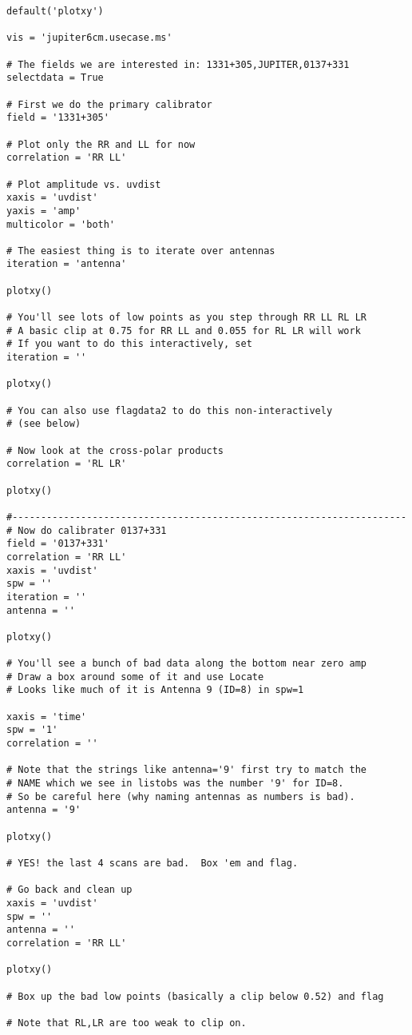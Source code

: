 \small
\begin{verbatim}
default('plotxy')

vis = 'jupiter6cm.usecase.ms'

# The fields we are interested in: 1331+305,JUPITER,0137+331
selectdata = True

# First we do the primary calibrator
field = '1331+305'

# Plot only the RR and LL for now
correlation = 'RR LL'

# Plot amplitude vs. uvdist
xaxis = 'uvdist'
yaxis = 'amp'
multicolor = 'both'

# The easiest thing is to iterate over antennas
iteration = 'antenna'

plotxy()

# You'll see lots of low points as you step through RR LL RL LR
# A basic clip at 0.75 for RR LL and 0.055 for RL LR will work
# If you want to do this interactively, set
iteration = ''

plotxy()

# You can also use flagdata2 to do this non-interactively
# (see below)

# Now look at the cross-polar products
correlation = 'RL LR'

plotxy()

#---------------------------------------------------------------------
# Now do calibrater 0137+331
field = '0137+331'
correlation = 'RR LL'
xaxis = 'uvdist'
spw = ''
iteration = ''
antenna = ''

plotxy()

# You'll see a bunch of bad data along the bottom near zero amp
# Draw a box around some of it and use Locate
# Looks like much of it is Antenna 9 (ID=8) in spw=1

xaxis = 'time'
spw = '1'
correlation = ''

# Note that the strings like antenna='9' first try to match the 
# NAME which we see in listobs was the number '9' for ID=8.
# So be careful here (why naming antennas as numbers is bad).
antenna = '9'

plotxy()

# YES! the last 4 scans are bad.  Box 'em and flag.

# Go back and clean up
xaxis = 'uvdist'
spw = ''
antenna = ''
correlation = 'RR LL'

plotxy()

# Box up the bad low points (basically a clip below 0.52) and flag

# Note that RL,LR are too weak to clip on.


\end{verbatim}
